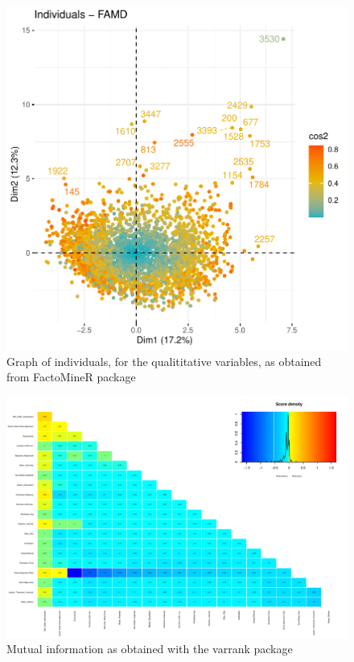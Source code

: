 \documentclass[12pt,%
               a4paper,%
               oneside,openany,%
               titlepage,%
               headinclude,footinclude,%
               BCOR5mm,%
               cleardoublepage=empty,%
               tablecaptionabove,%
               floatperchapter,
               ]{scrreprt}                 %
\begin{document}
\begin{figure}[h]
\begin{center}
\includegraphics[width=1\textwidth]{Figures/FAMD_Individuals_(c).pdf}
\caption{Graph of individuals, for the qualititative variables, as obtained from FactoMineR package \cite{le2008factominer}}
\label{FAMD_Individuals_(c)}
\end{center}
\end{figure}

\begin{landscape}
\begin{figure}
\begin{center}
\includegraphics[width=1.75\textheight]{Figures/Mutual_information.pdf}
\caption{Mutual information as obtained with the varrank package \cite{kratzer2018varrank}}
\label{Mutual_information}
\end{center}
\end{figure}
\end{landscape}
\end{document}

